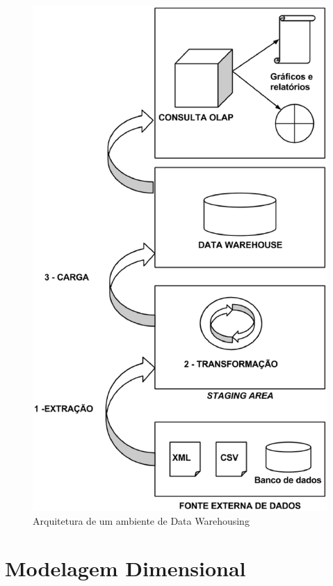 \begin{figure}[h!]
\centering
\includegraphics[keepaspectratio=false,scale=0.50]{figuras/figuras_matheus/etl.eps}
\caption{Arquitetura de um ambiente de Data Warehousing}
\label{fig:etl}
\end{figure}
\FloatBarrier



\section{Modelagem Dimensional}

